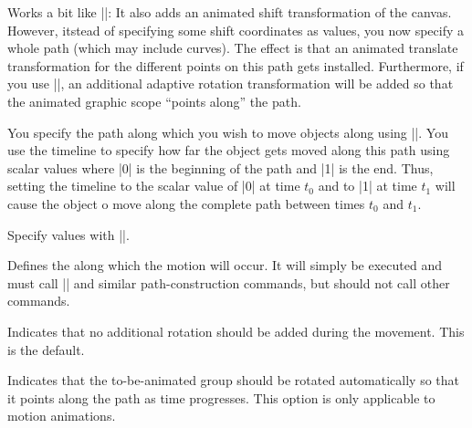 \begin{command}{\pgfsys@animatemotion}
  Works a bit like |\pgfsys@animation@translate|: It also adds an
  animated shift transformation of the canvas. However, itstead of
  specifying some shift coordinates as values, you now specify a whole
  path (which may include curves). The effect is that an animated
  translate transformation for the different points on this path gets
  installed. Furthermore, if you use |\pgfsys@animation@rotatealong|, an
  additional adaptive rotation transformation will be added so that
  the animated graphic scope ``points along'' the path.

  You specify the path along which you wish to move objects along
  using |\pgfsys@animation@movealong|. You use the timeline to specify
  how far the object gets moved along this path using scalar values
  where |0| is the beginning of the path and |1| is the end. Thus,
  setting the timeline to the scalar value of |0| at time $t_0$ and to
  |1| at time $t_1$ will cause the object o move along the complete
  path between times $t_0$ and $t_1$.
  
  Specify values with |\pgfsys@animation@val@scalar|.
    
  \begin{command}{\pgfsys@animation@movealong{}}
    Defines the  along which the motion will occur. It will
    simply be executed and must call |\pgfsys@lineto| and similar
    path-construction commands, but should not call other commands.
\begin{codeexample}[width=2cm]
\end{codeexample}
  \end{command}

  \begin{command}{\pgfsys@animation@norotatealong}
    Indicates that no additional rotation should be added during the
    movement. This is the default.
  \end{command}
  
  \begin{command}{\pgfsys@animation@rotatealong}
    Indicates that the to-be-animated group should be rotated
    automatically so that it points along the path as time
    progresses. This option is only applicable to motion animations.
\begin{codeexample}[width=2cm]
\end{codeexample}
  \end{command}

\end{command}


